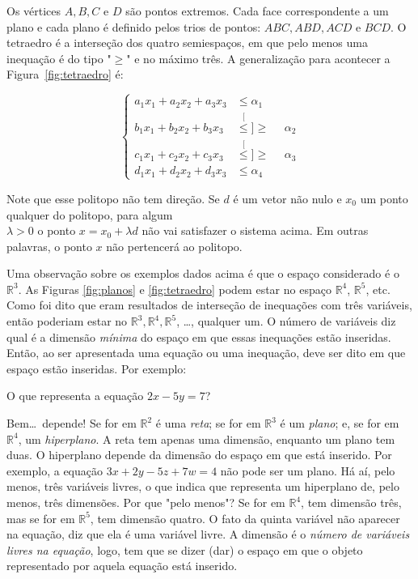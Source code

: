 Os vértices $ A, B, C $ e $ D $ são pontos extremos.
Cada face correspondente a um plano e cada plano é definido pelos trios de pontos:
$ ABC, ABD, ACD \text{ e } BCD $.
O tetraedro é a interseção dos quatro semiespaços, em que pelo menos uma inequação
é do tipo "$ \geq $" e no máximo três.
A generalização para acontecer a Figura~\ref{fig:tetraedro} é:

\[
  \begin{cases}
    a_1x_1 + a_2x_2 + a_3x_3 &\leq \alpha_1 \\
    b_1x_1 + b_2x_2 + b_3x_3 &\stackrel[\leq]{\geq}{\phantom{=}} \alpha_2 \\
    c_1x_1 + c_2x_2 + c_3x_3 &\stackrel[\leq]{\geq}{\phantom{=}} \alpha_3 \\
    d_1x_1 + d_2x_2 + d_3x_3 &\leq \alpha_4 
  \end{cases}
\]

Note que esse politopo não tem direção.
Se $ d $ é um vetor não nulo e $ x_0 $ um ponto qualquer do politopo, para algum\\
$ \lambda > 0 $ o ponto $ x = x_0 + \lambda d $ não vai satisfazer o sistema  
acima.
Em outras palavras, o ponto $ x $ não pertencerá ao politopo.

Uma observação sobre os exemplos dados acima é que o espaço considerado é o 
$ \mathbb{R}^3 $.
As Figuras \ref{fig:planos} e \ref{fig:tetraedro} podem estar no espaço 
$ \mathbb{R}^{4} $, $ \mathbb{R}^{5} $, etc.
Como foi dito que eram resultados de interseção de inequações com três variáveis,
então poderiam estar no $ \mathbb{R}^{3}, \mathbb{R}^{4}, \mathbb{R}^{5} $, 
\ldots, qualquer um.
O número de variáveis diz qual é a dimensão \textit{mínima} do espaço em que 
essas inequações estão inseridas.
Então, ao ser apresentada uma equação ou uma inequação, deve ser dito em que 
espaço estão inseridas.
Por exemplo:

\begin{exemplo}
  O que representa a equação $ 2x - 5y = 7 $?
\end{exemplo}

Bem\ldots\ depende!
Se for em $ \mathbb{R}^{2} $ é uma \textit{reta}; se for em $ \mathbb{R}^{3} $ é
um \textit{plano}; e, se for em $ \mathbb{R}^{4} $, um \textit{hiperplano}.
A reta tem apenas uma dimensão, enquanto um plano tem duas.
O hiperplano depende da dimensão do espaço em que está inserido.
Por exemplo, a equação $ 3x + 2y - 5z + 7w = 4 $ não pode ser um plano.
Há aí, pelo menos, três variáveis livres, o que indica que representa um 
hiperplano de, pelo menos, três dimensões.
Por que "pelo menos"?
Se for em $ \mathbb{R}^{4} $, tem dimensão três, mas se for em $ \mathbb{R}^{5} $,
tem dimensão quatro.
O fato da quinta variável não aparecer na equação, diz que ela é uma variável 
livre.
A dimensão é o \textit{número de variáveis livres na equação}, logo, tem que se
dizer (dar) o espaço em que o objeto representado por aquela equação está 
inserido.

